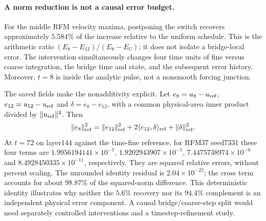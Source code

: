 \paragraph{A norm reduction is not a causal error budget.}
For the middle RFM velocity maxima, postponing the switch recovers approximately $5.584\%$ of the increase relative to the uniform schedule. This is the arithmetic ratio $(E_8-E_{12})/(E_8-E_U)$; it does not isolate a bridge-local error. The intervention simultaneously changes four time units of fine versus coarse integration, the bridge time and state, and the subsequent error history. Moreover, $t=8$ is inside the analytic pulse, not a nonsmooth forcing junction.

The saved fields make the nonadditivity explicit. Let $e_8=u_8-u_{\rm ref}$, $e_{12}=u_{12}-u_{\rm ref}$ and $\delta=e_8-e_{12}$, with a common physical-area inner product divided by $\|u_{\rm ref}\|^2$. Then
\begin{equation}
 \|e_8\|_{\rm ref}^2=\|e_{12}\|_{\rm ref}^2+
 2\langle e_{12},\delta\rangle_{\rm ref}+\|\delta\|_{\rm ref}^2.
 \label{eq:review-switch-attribution}
\end{equation}
At $t=72$ on layer144 against the time-fine reference, for RFM37 seed7331 these four terms are $1.9956194141\times10^{-7}$, $1.9202943907\times10^{-7}$, $7.4475738974\times10^{-9}$ and $8.4928450335\times10^{-11}$, respectively. They are squared relative errors, without percent scaling. The unrounded identity residual is $2.04\times10^{-22}$; the cross term accounts for about $98.87\%$ of the squared-norm difference. This deterministic identity illustrates why neither the $5.6\%$ recovery nor its $94.4\%$ complement is an independent physical error component. A causal bridge/coarse-step split would need separately controlled interventions and a timestep-refinement study.
